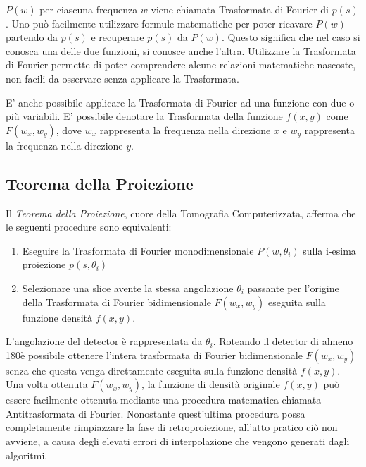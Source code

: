 \documentclass[a4paper,12pt, doubleside]{report}
\begin{document}
                \bigskip
                \par
                    $P(w)$ per ciascuna frequenza $w$ viene chiamata Trasformata di Fourier di $p(s)$. Uno può facilmente utilizzare formule matematiche per poter ricavare $P(w)$ partendo da $p(s)$ e recuperare $p(s)$ da $P(w)$. Questo significa che nel caso si conosca una delle due funzioni, si conosce anche l'altra. Utilizzare la Trasformata di Fourier permette di poter comprendere alcune relazioni matematiche nascoste, non facili da osservare senza applicare la Trasformata. 
                
                \bigskip
                \par
                    E' anche possibile applicare la Trasformata di Fourier ad una funzione con due o più variabili. E' possibile denotare la Trasformata della funzione $f(x,y)$ come $F(w_x,w_y)$, dove $w_x$ rappresenta la frequenza nella direzione $x$ e $w_y$ rappresenta la frequenza nella direzione $y$.
                    
            \subsection{Teorema della Proiezione}
                \par
                    Il \textit{Teorema della Proiezione}, cuore della Tomografia Computerizzata, afferma che le seguenti procedure sono equivalenti:
        
                    \begin{enumerate}
                        \item Eseguire la Trasformata di Fourier monodimensionale $P(w,\theta_i)$ sulla i-esima proiezione $p(s,\theta_i)$
                        \item Selezionare una slice avente la stessa angolazione $\theta_i$ passante per l'origine della Trasformata di Fourier bidimensionale $F(w_x,w_y)$ eseguita sulla funzione densità $f(x,y)$.  
                    \end{enumerate}
                \par
                    L'angolazione del detector è rappresentata da $\theta_i$. Roteando il detector di almeno 180\degree è possibile ottenere l'intera trasformata di Fourier bidimensionale $F(w_x,w_y)$ senza che questa venga direttamente eseguita sulla funzione densità $f(x,y)$.
                    Una volta ottenuta $F(w_x,w_y)$, la funzione di densità originale $f(x,y)$ può essere facilmente ottenuta mediante una procedura matematica chiamata Antitrasformata di Fourier. Nonostante quest'ultima procedura possa completamente rimpiazzare la fase di retroproiezione, all'atto pratico ciò non avviene, a causa degli elevati errori di interpolazione che vengono generati dagli algoritmi.
            
\end{document}
